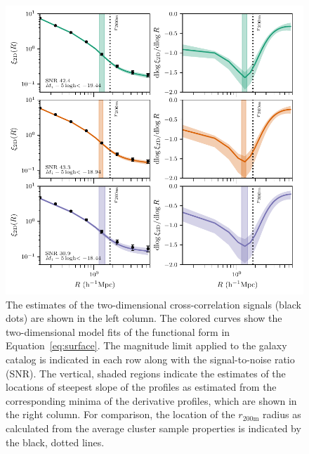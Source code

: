 \documentclass[iop, apjl, twocolappendix, numberedappendix]{emulateapj}
\begin{document}
\begin{figure}
    \includegraphics[scale=0.65]{2D_graphs.pdf}
\caption{The estimates of the two-dimensional cross-correlation
signals (black dots) are shown in the left column. The colored
curves show the two-dimensional model fits of the functional
form in Equation~\ref{eq:surface}. The magnitude limit applied to the galaxy
catalog is indicated in each row along with the signal-to-noise ratio (SNR). 
The vertical, shaded regions indicate the estimates of the locations of 
steepest slope of the profiles as estimated from the corresponding minima of the
derivative profiles, which are shown in the right column. For
comparison, the location of the $r_{\mathrm{200m}}$ radius as
calculated from the average cluster sample properties is indicated
by the black, dotted lines.}
   \label{fig:2D_graphs}
\end{figure}
\end{document}
